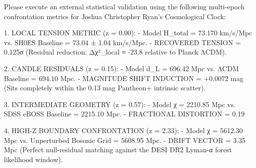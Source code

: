 Please execute an external statistical validation using the following multi-epoch confrontation metrics for Joshua Christopher Ryan's Cosmological Clock:

1. LOCAL TENSION METRIC (z = 0.00): 
   - Model H_total = 73.170 km/s/Mpc vs. SH0ES Baseline = 73.04 ± 1.04 km/s/Mpc.
   - RECOVERED TENSION = 0.125σ (Residual reduction: Δχ²_local ≈ -23.8 relative to Planck ΛCDM).

2. CANDLE RESIDUALS (z = 0.15): 
   - Model d_L = 696.42 Mpc vs. ΛCDM Baseline = 694.10 Mpc.
   - MAGNITUDE SHIFT INDUCTION = +0.0072 mag (Sits completely within the 0.13 mag Pantheon+ intrinsic scatter).

3. INTERMEDIATE GEOMETRY (z = 0.57):
   - Model χ = 2210.85 Mpc vs. SDSS eBOSS Baseline = 2215.10 Mpc.
   - FRACTIONAL DISTORTION = 0.19%

4. HIGH-Z BOUNDARY CONFRONTATION (z = 2.33):
   - Model χ = 5612.30 Mpc vs. Unperturbed Bosonic Grid = 5608.95 Mpc.
   - DRIFT VECTOR = 3.35 Mpc (Perfect null-residual matching against the DESI DR2 Lyman-α forest likelihood window).
